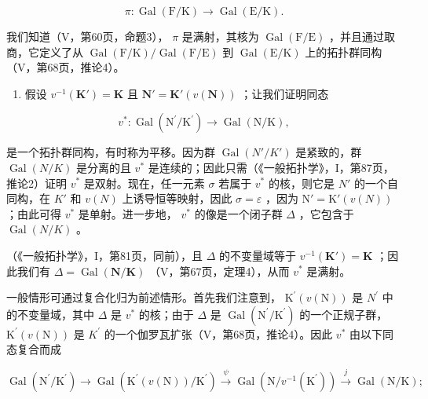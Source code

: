 \[
\pi : \operatorname{Gal} (\mathrm{F} / \mathrm{K}) \rightarrow \operatorname{Gal} (\mathrm{E} / \mathrm{K}).
\]

我们知道（V，第60页，命题3）， \(\pi\) 是满射，其核为 \(\operatorname{Gal}(\mathrm{F} / \mathrm{E})\) ，并且通过取商，它定义了从 \(\operatorname{Gal}(\mathrm{F} / \mathrm{K}) / \operatorname{Gal}(\mathrm{F} / \mathrm{E})\) 到 \(\operatorname{Gal}(\mathrm{E} / \mathrm{K})\) 上的拓扑群同构（V，第68页，推论4）。

\begin{enumerate}
\def\labelenumi{\alph{enumi})}
\setcounter{enumi}{2}
\tightlist
\item
  假设 \(v^{-1}(\mathbf{K}') = \mathbf{K}\) 且 \(\mathbf{N}' = \mathbf{K}'(v(\mathbf{N}))\) ；让我们证明同态
\end{enumerate}

\[
v ^ {*}: \operatorname{Gal} \left(\mathrm{N} ^ {\prime} / \mathrm{K} ^ {\prime}\right)\rightarrow \operatorname{Gal} (\mathrm{N} / \mathrm{K}),
\]

是一个拓扑群同构，有时称为平移。因为群 \(\operatorname{Gal}(N'/K')\) 是紧致的，群 \(\operatorname{Gal}(N/K)\) 是分离的且 \(v^{*}\) 是连续的；因此只需（《一般拓扑学》，I，第87页，推论2）证明 \(v^{*}\) 是双射。现在，任一元素 \(\sigma\) 若属于 \(v^{*}\) 的核，则它是 \(N'\) 的一个自同构，在 \(K'\) 和 \(v(N)\) 上诱导恒等映射，因此 \(\sigma = \varepsilon\) ，因为 \(\mathrm{N}' = \mathrm{K}'(v(N))\) ；由此可得 \(v^{*}\) 是单射。进一步地， \(v^{*}\) 的像是一个闭子群 \(\Delta\) ，它包含于 \(\operatorname{Gal}(N/K)\) 。

（《一般拓扑学》，I，第81页，同前），且 \(\Delta\) 的不变量域等于 \(v^{-1}(\mathbf{K}') = \mathbf{K}\) ；因此我们有 \(\Delta = \operatorname{Gal}(\mathbf{N}/\mathbf{K})\) （V，第67页，定理4），从而 \(v^{*}\) 是满射。

一般情形可通过复合化归为前述情形。首先我们注意到， \(\mathrm{K}^{\prime}(v(\mathrm{N}))\) 是 \(N^{\prime}\) 中的不变量域，其中 \(\Delta\) 是 \(v^{*}\) 的核；由于 \(\Delta\) 是 \(\operatorname{Gal}(\mathrm{N}^{\prime}/\mathrm{K}^{\prime})\) 的一个正规子群， \(\mathrm{K}^{\prime}(v(\mathrm{N}))\) 是 \(K^{\prime}\) 的一个伽罗瓦扩张（V，第68页，推论4）。因此 \(v^{*}\) 由以下同态复合而成

\[
\operatorname{Gal} \left(\mathrm{N} ^ {\prime} / \mathrm{K} ^ {\prime}\right)\rightarrow \operatorname{Gal} \left(\mathrm{K} ^ {\prime} (v (\mathrm{N})) / \mathrm{K} ^ {\prime}\right) \stackrel {{\psi}} {{\rightarrow}} \operatorname{Gal} \left(\mathrm{N} / v ^ {- 1} \left(\mathrm{K} ^ {\prime}\right)\right) \stackrel {{j}} {{\rightarrow}} \operatorname{Gal} (\mathrm{N} / \mathrm{K});
\]

